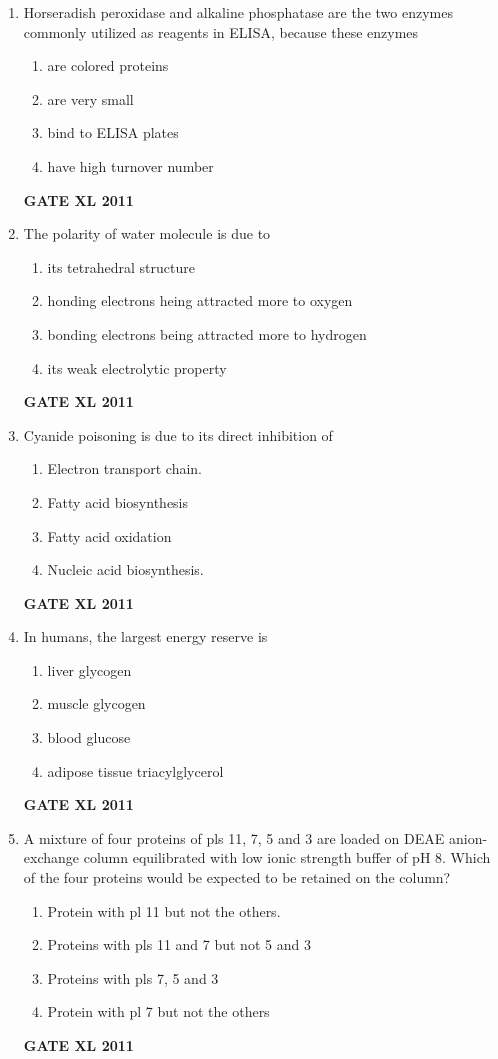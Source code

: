 \documentclass[journal,12pt,onecolumn]{IEEEtran}
\begin{document}
\begin{enumerate}
	\item{ Horseradish peroxidase and alkaline phosphatase are the two enzymes commonly utilized as reagents in ELISA, because these enzymes}
		\begin{enumerate}
			\item are colored proteins
			\item are very small
			\item bind to ELISA plates
			\item have high turnover number
		\end{enumerate}
		\hfill{\textbf{GATE XL 2011}}

	\item {The polarity of water molecule is due to}
		\begin{enumerate}
			\item its tetrahedral structure
			\item honding electrons heing attracted more to oxygen 
			\item bonding electrons being attracted more to hydrogen
			\item its weak electrolytic property
		\end{enumerate}
		\hfill{\textbf{GATE XL 2011}}

	\item {Cyanide poisoning is due to its direct inhibition of}
		\begin{enumerate}
			\item Electron transport chain.
			\item Fatty acid biosynthesis
			\item Fatty acid oxidation
			\item Nucleic acid biosynthesis.
		\end{enumerate}
		\hfill{\textbf{GATE XL 2011}}

	\item{ In humans, the largest energy reserve is}
		\begin{enumerate}
			\item liver glycogen
			\item muscle glycogen
			\item blood glucose
			\item adipose tissue triacylglycerol
		\end{enumerate}
		\hfill{\textbf{GATE XL 2011}}

\item {A mixture of four proteins of pls 11, 7, 5 and 3 are loaded on DEAE anion-exchange column equilibrated with low ionic strength buffer of pH 8. Which of the four proteins would be expected to be retained on the column?}
		\begin{enumerate}
			\item Protein with pl 11 but not the others.
			\item Proteins with pls 11 and 7 but not 5 and 3
			\item Proteins with pls 7, 5 and 3
			\item Protein with pl 7 but not the others
		\end{enumerate}
		\hfill{\textbf{GATE XL 2011}}


\end{enumerate}
\end{document}
